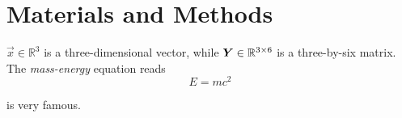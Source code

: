 
\section{Materials and Methods \label{sec:materials-and-methods}}
    \(\vec{x}\in\mathbb{R}^3\) is a three-dimensional vector, while \(\mat{Y}\in\mathbb{R}^{3\times 6}\) is a three-by-six matrix. 
    The \emph{mass-energy} equation reads
    \begin{equation}
        \label{eq:mass-energy-equivalence}
	    E = m c^2
    \end{equation}

     is very famous.
